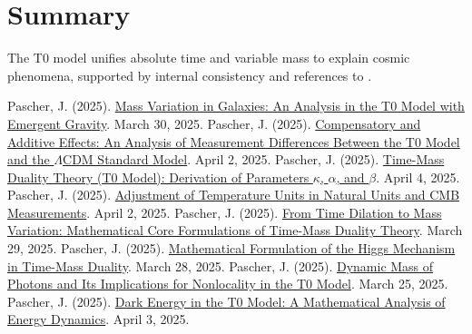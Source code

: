 \documentclass[a4paper,12pt]{article}
\theoremstyle{definition}
\theoremstyle{remark}
\begin{document}
	\section{Summary}
	
	The T0 model unifies absolute time and variable mass to explain cosmic phenomena, supported by internal consistency and references to \cite{pascher_galaxies_2025, pascher_params_2025, pascher_messdifferenzen_2025}.
	
	\begin{thebibliography}{99}
		 Pascher, J. (2025). \href{https://github.com/jpascher/T0-Time-Mass-Duality/tree/main/2/pdf/English/Massenvariation in Galaxien_en.pdf}{Mass Variation in Galaxies: An Analysis in the T0 Model with Emergent Gravity}. March 30, 2025.
		 Pascher, J. (2025). \href{https://github.com/jpascher/T0-Time-Mass-Duality/tree/main/2/pdf/English/Analyse der Messdifferenzen zwischen dem T0-Modell und dem Standardmodell_en.pdf}{Compensatory and Additive Effects: An Analysis of Measurement Differences Between the T0 Model and the \(\Lambda\)CDM Standard Model}. April 2, 2025.
		 Pascher, J. (2025). \href{https://github.com/jpascher/T0-Time-Mass-Duality/tree/main/2/pdf/English/Zeit-Masse-Dualitätstheorie (T0-Modell) Herleitung der Parameter kappa, alpha und beta_en.pdf}{Time-Mass Duality Theory (T0 Model): Derivation of Parameters \(\kappa\), \(\alpha\), and \(\beta\)}. April 4, 2025.
		 Pascher, J. (2025). \href{https://github.com/jpascher/T0-Time-Mass-Duality/tree/main/2/pdf/English/Anpassung von Temperatureinheiten in natürlichen Einheiten und CMB-Messungen_en.pdf}{Adjustment of Temperature Units in Natural Units and CMB Measurements}. April 2, 2025.
		 Pascher, J. (2025). \href{https://github.com/jpascher/T0-Time-Mass-Duality/tree/main/2/pdf/English/Mathematische Formulierungen der Zeit-Masse-Dualitätstheorie mit Lagrange_en.pdf}{From Time Dilation to Mass Variation: Mathematical Core Formulations of Time-Mass Duality Theory}. March 29, 2025.
		 Pascher, J. (2025). \href{https://github.com/jpascher/T0-Time-Mass-Duality/tree/main/2/pdf/English/Mathematische Formulierung des Higgs-Mechanismus in der Zeit-Masse-Dualität_en.pdf}{Mathematical Formulation of the Higgs Mechanism in Time-Mass Duality}. March 28, 2025.
		 Pascher, J. (2025). \href{https://github.com/jpascher/T0-Time-Mass-Duality/tree/main/2/pdf/English/Dynamische Masse von Photonen und ihre Implikationen für Nichtlokalität_en.tex}{Dynamic Mass of Photons and Its Implications for Nonlocality in the T0 Model}. March 25, 2025.
		 Pascher, J. (2025). \href{https://github.com/jpascher/T0-Time-Mass-Duality/tree/main/2/pdf/English/Eine mathematische Analyse der Energiedynamik_en.pdf}{Dark Energy in the T0 Model: A Mathematical Analysis of Energy Dynamics}. April 3, 2025.
	\end{thebibliography}
	
\end{document}
